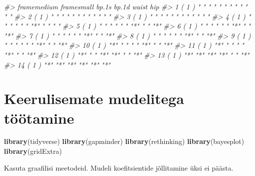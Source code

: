 \documentclass[]{book}
\newenvironment{Shaded}{\begin{snugshade}}{\end{snugshade}}
\newcommand{\KeywordTok}[1]{\textcolor[rgb]{0.13,0.29,0.53}{\textbf{#1}}}
\newcommand{\DataTypeTok}[1]{\textcolor[rgb]{0.13,0.29,0.53}{#1}}
\newcommand{\DecValTok}[1]{\textcolor[rgb]{0.00,0.00,0.81}{#1}}
\newcommand{\StringTok}[1]{\textcolor[rgb]{0.31,0.60,0.02}{#1}}
\newcommand{\CommentTok}[1]{\textcolor[rgb]{0.56,0.35,0.01}{\textit{#1}}}
\newcommand{\OperatorTok}[1]{\textcolor[rgb]{0.81,0.36,0.00}{\textbf{#1}}}
\newcommand{\NormalTok}[1]{#1}
\begin{document}
\begin{Shaded}
\begin{Highlighting}[]
\CommentTok{#>           framemedium framesmall bp.1s bp.1d waist hip}
\CommentTok{#> 1  ( 1 )  " "         " "        " "   " "   " "   " "}
\CommentTok{#> 2  ( 1 )  " "         " "        " "   " "   " "   " "}
\CommentTok{#> 3  ( 1 )  " "         " "        " "   " "   " "   " "}
\CommentTok{#> 4  ( 1 )  " "         " "        " "   "*"   " "   " "}
\CommentTok{#> 5  ( 1 )  " "         " "        " "   "*"   " "   "*"}
\CommentTok{#> 6  ( 1 )  " "         " "        " "   "*"   " "   "*"}
\CommentTok{#> 7  ( 1 )  " "         " "        " "   "*"   " "   "*"}
\CommentTok{#> 8  ( 1 )  " "         " "        " "   "*"   " "   "*"}
\CommentTok{#> 9  ( 1 )  " "         " "        " "   "*"   " "   "*"}
\CommentTok{#> 10  ( 1 ) "*"         " "        " "   "*"   " "   "*"}
\CommentTok{#> 11  ( 1 ) "*"         " "        " "   "*"   " "   "*"}
\CommentTok{#> 12  ( 1 ) "*"         " "        "*"   "*"   " "   "*"}
\CommentTok{#> 13  ( 1 ) "*"         "*"        "*"   "*"   " "   "*"}
\CommentTok{#> 14  ( 1 ) "*"         "*"        "*"   "*"   "*"   "*"}
\end{Highlighting}
\end{Shaded}

\chapter{Keerulisemate mudelitega
töötamine}\label{keerulisemate-mudelitega-tootamine}

\begin{Shaded}
\begin{Highlighting}[]
\KeywordTok{library}\NormalTok{(tidyverse)}
\KeywordTok{library}\NormalTok{(gapminder)}
\KeywordTok{library}\NormalTok{(rethinking)}
\KeywordTok{library}\NormalTok{(bayesplot)}
\KeywordTok{library}\NormalTok{(gridExtra)}
\end{Highlighting}
\end{Shaded}

Kasuta graafilisi meetodeid. Mudeli koefitsientide jõllitamine üksi ei
päästa.

\begin{Shaded}
\end{Shaded}
\end{document}
